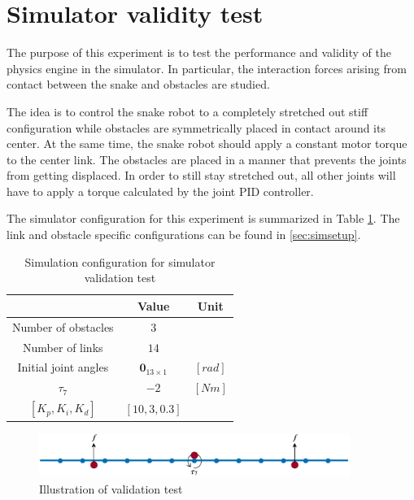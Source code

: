 \section{Simulator validity test}

The purpose of this experiment is to test the performance and validity of the physics engine in the simulator. In particular, the interaction forces arising from contact between the snake and obstacles are studied.

The idea is to control the snake robot to a completely stretched out stiff configuration while obstacles are symmetrically placed in contact around its center. At the same time, the snake robot should apply a constant motor torque to the center link. The obstacles are placed in a manner that prevents the joints from getting displaced. In order to still stay stretched out, all other joints will have to apply a torque calculated by the joint PID controller.

The simulator configuration for this experiment is summarized in Table \ref{tab:exp_valid1}. The link and obstacle specific configurations can be found in \ref{sec:simsetup}.

\begin{table}[h!]
    \centering
    \begin{tabular}{|c|c|c|}
        \hline
        & \textbf{Value} & \textbf{Unit}\\
        \hline \hline
        Number of obstacles & $3$ & \\
        Number of links & $14$ & \\
        Initial joint angles & $\mathbf{0}_{13 \times 1}$ & $[rad]$ \\
        $\tau_7$ & $-2$ & $[Nm]$ \\
        $[K_p, K_i, K_d]$ & $[10, 3, 0.3]$ &\\
        \hline
    \end{tabular}
    \caption{Simulation configuration for simulator validation test}
    \label{tab:exp_valid1}
\end{table}

\begin{figure}
    \centering
    \includegraphics[width=0.9\textwidth]{figures/experiments/exp_valid1.pdf}
    \caption{Illustration of validation test}
    \label{fig:valid1_sketch}
\end{figure}

